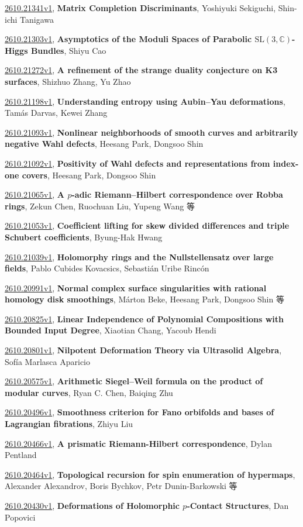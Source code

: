 \documentclass[9pt, a4paper]{article}
\theoremstyle{plain}
\theoremstyle{definition}
\theoremstyle{remark}
\newcommand{\arxiv}[3]{\href{https://arxiv.org/abs/#1}{#1}, \textbf{\textcolor{arxivblue}{#2}}, #3}
\begin{document}
\arxiv{2610.21341v1}{Matrix Completion Discriminants}{Yoshiyuki Sekiguchi, Shin-ichi Tanigawa}

\arxiv{2610.21303v1}{Asymptotics of the Moduli Spaces of Parabolic $\mathrm{SL}(3,\mathbb C)$-Higgs Bundles}{Shiyu Cao}

\arxiv{2610.21272v1}{A refinement of the strange duality conjecture on K3 surfaces}{Shizhuo Zhang, Yu Zhao}

\arxiv{2610.21198v1}{Understanding entropy using Aubin--Yau deformations}{Tamás Darvas, Kewei Zhang}

\arxiv{2610.21093v1}{Nonlinear neighborhoods of smooth curves and arbitrarily negative Wahl defects}{Heesang Park, Dongsoo Shin}

\arxiv{2610.21092v1}{Positivity of Wahl defects and representations from index-one covers}{Heesang Park, Dongsoo Shin}

\arxiv{2610.21065v1}{A $p$-adic Riemann--Hilbert correspondence over Robba rings}{Zekun Chen, Ruochuan Liu, Yupeng Wang 等}

\arxiv{2610.21053v1}{Coefficient lifting for skew divided differences and triple Schubert coefficients}{Byung-Hak Hwang}

\arxiv{2610.21039v1}{Holomorphy rings and the Nullstellensatz over large fields}{Pablo Cubides Kovacsics, Sebastián Uribe Rincón}

\arxiv{2610.20991v1}{Normal complex surface singularities with rational homology disk smoothings}{Márton Beke, Heesang Park, Dongsoo Shin 等}

\arxiv{2610.20825v1}{Linear Independence of Polynomial Compositions with Bounded Input Degree}{Xiaotian Chang, Yacoub Hendi}

\arxiv{2610.20801v1}{Nilpotent Deformation Theory via Ultrasolid Algebra}{Sofía Marlasca Aparicio}

\arxiv{2610.20575v1}{Arithmetic Siegel--Weil formula on the product of modular curves}{Ryan C. Chen, Baiqing Zhu}

\arxiv{2610.20496v1}{Smoothness criterion for Fano orbifolds and bases of Lagrangian fibrations}{Zhiyu Liu}

\arxiv{2610.20466v1}{A prismatic Riemann-Hilbert correspondence}{Dylan Pentland}

\arxiv{2610.20464v1}{Topological recursion for spin enumeration of hypermaps}{Alexander Alexandrov, Boris Bychkov, Petr Dunin-Barkowski 等}

\arxiv{2610.20430v1}{Deformations of Holomorphic $p$-Contact Structures}{Dan Popovici}
\end{document}
